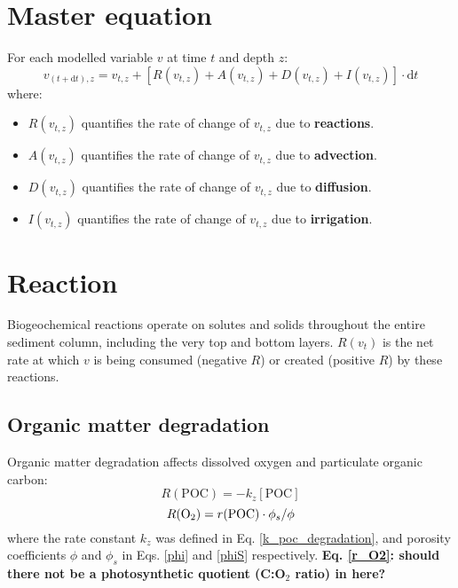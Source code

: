 \documentclass[a4paper]{article}
\newcommand{\D}[1]{\mathrm{d}#1}
\newcommand{\wtf}[1]{\textcolor{Cerulean}{\textbf{#1}}}
\begin{document}
\section{Master equation}

For each modelled variable $v$ at time $t$ and depth $z$:
\begin{equation}
v_{(t+\D{t}), z} = v_{t,z} + [R(v_{t,z}) + A(v_{t,z}) + D(v_{t,z}) + I(v_{t,z})] \cdot \D{t}
\end{equation}
where:
\begin{itemize}
  \item $R(v_{t,z})$ quantifies the rate of change of $v_{t,z}$ due to \textbf{reactions}.
  \item $A(v_{t,z})$ quantifies the rate of change of $v_{t,z}$ due to \textbf{advection}.
  \item $D(v_{t,z})$ quantifies the rate of change of $v_{t,z}$ due to \textbf{diffusion}.
  \item $I(v_{t,z})$ quantifies the rate of change of $v_{t,z}$ due to \textbf{irrigation}.
\end{itemize}

\section{Reaction}

Biogeochemical reactions operate on solutes and solids throughout the entire sediment column, including the very top and bottom layers. $R(v_t)$ is the net rate at which $v$ is being consumed (negative $R$) or created (positive $R$) by these reactions.

\subsection{Organic matter degradation}

Organic matter degradation affects dissolved oxygen and particulate organic carbon:
\begin{equation}
R(\mathrm{POC}) = -k_z [\mathrm{POC}]
\end{equation}
\begin{equation}\label{r_O2}
R(\ce{O2}) = r(\mathrm{POC}) \cdot \phi_s / \phi
\end{equation}
where the rate constant $k_z$ was defined in Eq. \eqref{k_poc_degradation}, and porosity coefficients $\phi$ and $\phi_s$ in Eqs. \eqref{phi} and \eqref{phiS} respectively. \wtf{Eq. \eqref{r_O2}: should there not be a photosynthetic quotient (C:O$_2$ ratio) in here?}
\end{document}
